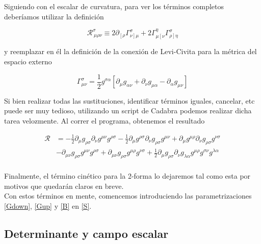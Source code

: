 \documentclass{article}
\numberwithin{equation}{section}
\begin{document}
Siguiendo con el escalar de curvatura, para ver los términos completos deberíamos utilizar la definición 

\begin{equation}\label{riccitensor}
\mathcal{R}^{\sigma}_{ \ \mu \rho \nu} \equiv 2\partial_{\left[ \rho \right.} \Gamma^{\sigma}_{\left. \nu \right]\mu } +   2\Gamma^{\eta}_{\mu\left[ \nu \right.}\Gamma^{\sigma}_{ \left. \rho \right] \eta}
\end{equation}

y reemplazar en él la definición de la conexión de Levi-Civita para la métrica del espacio externo

\begin{equation}\label{levicivita}
\Gamma^{\sigma}_{\mu \nu} = \frac{1}{2}g^{\sigma \alpha}\left[ \partial_{\mu} g_{ \alpha \nu} + \partial_{\nu} g_{\mu \alpha} - \partial_{\alpha} g_{\mu \nu} \right]
\end{equation}

Si bien realizar todas las sustituciones, identificar términos iguales, cancelar, etc puede ser muy tedioso, utilizando un script de Cadabra podemos realizar dicha tarea velozmente. Al correr el programa, obtenemos el resultado

\begin{equation}
\begin{aligned}
\mathcal{R} &= - \frac{1}{2}\partial_{\mu}{g_{\rho \sigma}} \partial_{\nu}{g^{\mu \nu}} g^{\rho \sigma} - \frac{1}{2}\partial_{\mu}{g^{\rho \sigma}} \partial_{\nu}{g_{\rho \sigma}} g^{\mu \nu} + \partial_{\mu}{g^{\mu \rho}} \partial_{\nu}{g_{\rho \sigma}} g^{\nu \sigma}\\
& -\partial_{\mu \nu}{g_{\rho \sigma}} g^{\mu \nu} g^{\rho \sigma} +\partial_{\mu \nu}{g_{\rho \sigma}} g^{\mu \rho} g^{\nu \sigma} + \frac{1}{2}\partial_{\mu}{g_{\rho \sigma}} \partial_{\nu}{g_{\lambda \alpha}} g^{\mu \rho} g^{\sigma \nu} g^{\lambda \alpha}\\
\end{aligned}
\end{equation}


Finalmente, el término cinético para la 2-forma lo dejaremos tal como esta por motivos que quedarán claros en breve.\\


Con estos términos en mente, comencemos introduciendo las parametrizaciones \ref{Gdown}, \ref{Gup} y \ref{B} en \ref{S}. 

\subsection{Determinante y campo escalar}
\end{document}
